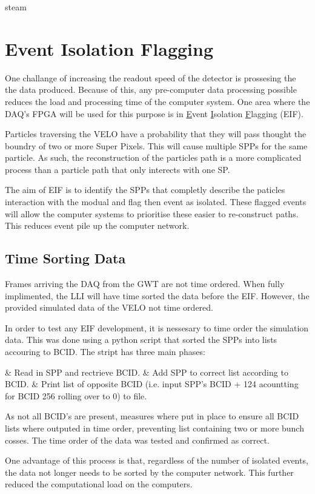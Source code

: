 steam
\section{Event Isolation Flagging}
	
	One challange of increasing the readout speed of the detector is prossesing the the data produced.
	Because of this, any pre-computer data processing possible reduces the load and processing time of the computer system.
	One area where the DAQ's FPGA will be used for this purpose is in \underline{E}vent \underline{I}solation \underline{F}lagging (EIF).
	\par
	Particles traversing the VELO have a probability that they will pass thought the boundry of two or more Super Pixels.
	This will cause multiple SPPs for the same particle.
	As such, the reconstruction of the particles path is a more complicated process than a particle path that only interects with one SP.
	\par
	The aim of EIF is to identify the SPPs that completly describe the paticles interaction with the modual and flag then event as isolated.
	These flagged events will allow the computer systems to prioritise these easier to re-construct paths.
	This reduces event pile up the computer network.

	\subsection{Time Sorting Data}

		Frames arriving the DAQ from the GWT are not time ordered.
		When fully implimented, the LLI will have time sorted the data before the EIF.
		However, the provided simulated data of the VELO not time ordered.
		\par
		In order to test any EIF development, it is nessesary to time order the simulation data.
		This was done using a python script that sorted the SPPs into lists accouring to BCID.
		The stript has three main phases:

		\begin{easylist}
			& Read in SPP and rectrieve BCID.
			& Add SPP to correct list according to BCID.
			& Print list of opposite BCID (i.e. input SPP's BCID + 124 acountting for BCID 256 rolling over to 0) to file.
		\end{easylist}

		As not all BCID's are present, measures where put in place to ensure all BCID lists where outputed in time order, preventing list containing two or more bunch cosses. The time order of the data was tested and confirmed as correct.
		\par
		One advantage of this process is that, regardless of the number of isolated events, the data not longer needs to be sorted by the computer network.
		This further reduced the computational load on the computers.


